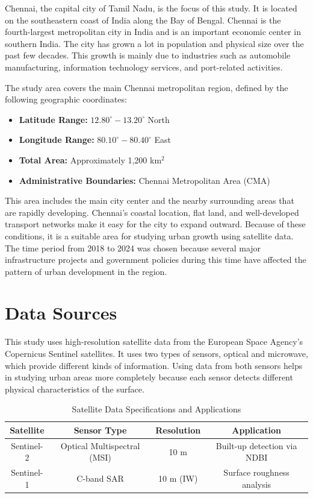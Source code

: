\documentclass[conference]{IEEEtran}
\begin{document}
Chennai, the capital city of Tamil Nadu, is the focus of this study. It is located on the southeastern coast of India along the Bay of Bengal. Chennai is the fourth-largest metropolitan city in India and is an important economic center in southern India. The city has grown a lot in population and physical size over the past few decades. This growth is mainly due to industries such as automobile manufacturing, information technology services, and port-related activities.

The study area covers the main Chennai metropolitan region, defined by the following geographic coordinates:
\begin{itemize}
    \item \textbf{Latitude Range:} $12.80^\circ - 13.20^\circ$ North
    \item \textbf{Longitude Range:} $80.10^\circ - 80.40^\circ$ East
    \item \textbf{Total Area:} Approximately 1,200 km$^2$
    \item \textbf{Administrative Boundaries:} Chennai Metropolitan Area (CMA)
\end{itemize}

This area includes the main city center and the nearby surrounding areas that are rapidly developing. Chennai’s coastal location, flat land, and well-developed transport networks make it easy for the city to expand outward. Because of these conditions, it is a suitable area for studying urban growth using satellite data. The time period from 2018 to 2024 was chosen because several major infrastructure projects and government policies during this time have affected the pattern of urban development in the region.

\section{Data Sources}

This study uses high-resolution satellite data from the European Space Agency’s Copernicus Sentinel satellites. It uses two types of sensors, optical and microwave, which provide different kinds of information. Using data from both sensors helps in studying urban areas more completely because each sensor detects different physical characteristics of the surface.

\begin{table}[htbp]
\renewcommand{\arraystretch}{1.3} %
\caption{Satellite Data Specifications and Applications}
\begin{center}
\begin{tabularx}{\columnwidth}{|C|C|C|C|}
\hline
\textbf{Satellite} & \textbf{Sensor Type} & \textbf{Resolution} & \textbf{Application} \\
\hline
Sentinel-2 & Optical Multispectral (MSI) & 10 m & Built-up detection via NDBI \\
\hline
Sentinel-1 & C-band SAR & 10 m (IW) & Surface roughness analysis \\
\hline
\end{tabularx}
\label{tab_data_sources}
\end{center}
\end{table}
\end{document}
